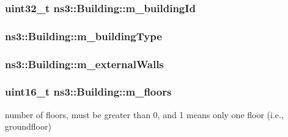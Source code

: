\subsubsection[{\texorpdfstring{m\+\_\+building\+Id}{m_buildingId}}]{\setlength{\rightskip}{0pt plus 5cm}uint32\+\_\+t ns3\+::\+Building\+::m\+\_\+building\+Id\hspace{0.3cm}{\ttfamily [private]}}\hypertarget{classns3_1_1Building_a19845ef02179e4e1363de6648b237959}{}\label{classns3_1_1Building_a19845ef02179e4e1363de6648b237959}
\subsubsection[{\texorpdfstring{m\+\_\+building\+Type}{m_buildingType}}]{ ns3\+::\+Building\+::m\+\_\+building\+Type\hspace{0.3cm}{\ttfamily [private]}}\hypertarget{classns3_1_1Building_a1d867df5fda29c3596f7fa8b899f7e66}{}\label{classns3_1_1Building_a1d867df5fda29c3596f7fa8b899f7e66}
\subsubsection[{\texorpdfstring{m\+\_\+external\+Walls}{m_externalWalls}}]{ ns3\+::\+Building\+::m\+\_\+external\+Walls\hspace{0.3cm}{\ttfamily [private]}}\hypertarget{classns3_1_1Building_a2a1fd1627ce2344fb1b3b1b2cb579cc8}{}\label{classns3_1_1Building_a2a1fd1627ce2344fb1b3b1b2cb579cc8}
\subsubsection[{\texorpdfstring{m\+\_\+floors}{m_floors}}]{\setlength{\rightskip}{0pt plus 5cm}uint16\+\_\+t ns3\+::\+Building\+::m\+\_\+floors\hspace{0.3cm}{\ttfamily [private]}}\hypertarget{classns3_1_1Building_a82496b3cc437fd47bdec4d510fdba302}{}\label{classns3_1_1Building_a82496b3cc437fd47bdec4d510fdba302}
number of floors, must be greater than 0, and 1 means only one floor (i.\+e., groundfloor) 
